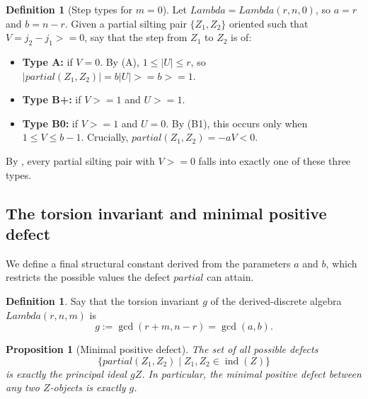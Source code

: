 \documentclass[11pt, a4paper]{article}
\newtheorem{proposition}[theorem]{Proposition}
\theoremstyle{definition}
\newtheorem{definition}[theorem]{Definition}
\def\Lambda{Lambda}%
\def\partial{partial}%
\def\ge{>=}%
\def\mathbb#1{#1}%
\def\mathcal#1{#1}%
\begin{document}
\begin{definition}[Step types for $m=0$]\label{def:step-types}
Let $\Lambda = \Lambda(r,n,0)$, so $a=r$ and $b=n-r$. Given a partial silting pair $\{Z_1, Z_2\}$ oriented such that $V = j_2 - j_1 \ge 0$, say that the step from $Z_1$ to $Z_2$ is of:
\begin{itemize}
    \item \textbf{Type A:} if $V = 0$. By (A), $1 \le |U| \le r$, so $|\partial(Z_1, Z_2)| = b|U| \ge b \ge 1$.
    \item \textbf{Type B+:} if $V \ge 1$ and $U \ge 1$.
    \item \textbf{Type B0:} if $V \ge 1$ and $U = 0$. By \textup{(B1)}, this occurs only when $1 \le V \le b-1$. Crucially, $\partial(Z_1, Z_2) = -aV < 0$.
\end{itemize}
By , every partial silting pair with $V\ge0$ falls into exactly one of these three types.
\end{definition}

\subsection{The torsion invariant and minimal positive defect}
\label{subsec:torsion}

We define a final structural constant derived from the parameters $a$ and $b$, which restricts the possible values the defect $\partial$ can attain.

\begin{definition}\label{def:torsion}
Say that the torsion invariant $g$ of the derived-discrete algebra $\Lambda(r,n,m)$ is
\[
  g := \gcd(r+m, n-r) = \gcd(a, b).
\]
\end{definition}

\begin{proposition}[Minimal positive defect]\label{prop:min-defect}
The set of all possible defects
\[
  \{\partial(Z_1, Z_2) \mid Z_1, Z_2 \in \operatorname{ind}(\mathcal Z)\}
\]
is exactly the principal ideal $g \mathbb Z$. In particular, the minimal positive defect between any two $\mathcal Z$-objects is exactly $g$.
\end{proposition}
\end{document}
